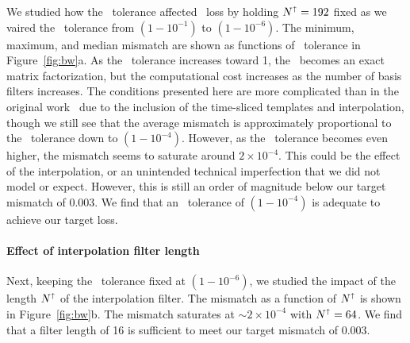 We studied how the \SVD\ tolerance affected \SNR\ loss by holding
$N^\shortuparrow = 192$ fixed as we vaired the \SVD\ tolerance from
$\left(1-10^{-1}\right)$ to $\left(1-10^{-6}\right)$.  The minimum, maximum, and median
mismatch are shown as functions of \SVD\ tolerance in
Figure~\ref{fig:bw}a.  As the \SVD\ tolerance increases toward 1, the
\SVD\ becomes an exact matrix factorization, but the computational cost increases as
the number of basis filters increases.  The conditions presented here are more
complicated than in the original work~\citep{Cannon:2010p10398} due to the inclusion
of the time-sliced templates and interpolation, though we still see that the average
mismatch is approximately proportional to the \SVD\ tolerance down to
$\left(1-10^{-4}\right)$.  However, as the \SVD\ tolerance becomes even higher, the
mismatch seems to saturate around $2 \times 10^{-4}$.  This could be the effect of the
interpolation, or an unintended technical imperfection that we did not model or expect.
However, this is still an order of magnitude below our target mismatch of 0.003.  We
find that an \SVD\ tolerance of $\left(1-10^{-4}\right)$ is adequate to achieve our
target \SNR{} loss.

\paragraph{Effect of interpolation filter length}

Next, keeping the \SVD\ tolerance fixed at $\left(1-10^{-6}\right)$, we studied the
impact of the length $N^\shortuparrow$ of the interpolation filter.  The mismatch as
a function of $N^\shortuparrow$ is shown in Figure~\ref{fig:bw}b.  The
mismatch saturates at $\sim$$2 \times 10^{-4}$ with $N^\shortuparrow = 64$.  We find
that a filter length of 16 is sufficient to meet our target mismatch of 0.003.

